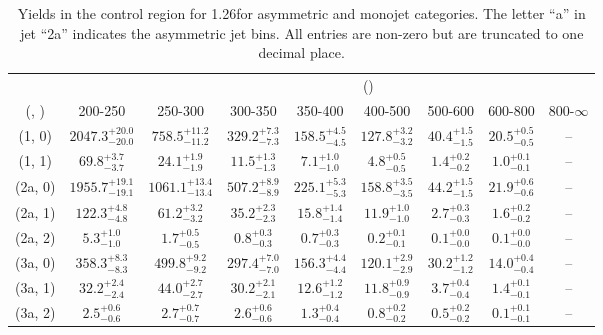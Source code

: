 \begin{table}[h!]
\tiny
\centering
\caption{Yields in the \mj control region for 1.26\ifb for asymmetric and monojet categories. The letter ``a'' in jet \eg ``2a''  indicates the asymmetric jet bins. All entries are non-zero but are truncated to one decimal place.\label{tab:yieldssep_mu_wjetstolnuht_asym}}
\begin{tabular}
{ccccccccc}
	\hline\hline
&	& \multicolumn{8}{c}{\scalht (\gev)} \\ 
	 (\njet,  \nb) & 200-250 & 250-300 & 300-350 & 350-400 & 400-500 & 500-600 & 600-800 & 800-$\infty$ \\ [0.8ex] 
\hline
	(1, 0) & $2047.3^{+ 20.0 }_{- 20.0 }$ & $758.5^{+ 11.2 }_{- 11.2 }$ & $329.2^{+ 7.3 }_{- 7.3 }$ & $158.5^{+ 4.5 }_{- 4.5 }$ & $127.8^{+ 3.2 }_{- 3.2 }$ & $40.4^{+ 1.5 }_{- 1.5 }$ & $20.5^{+ 0.5 }_{- 0.5 }$ & -- \\[0.5ex] 
	(1, 1) & $69.8^{+ 3.7 }_{- 3.7 }$ & $24.1^{+ 1.9 }_{- 1.9 }$ & $11.5^{+ 1.3 }_{- 1.3 }$ & $7.1^{+ 1.0 }_{- 1.0 }$ & $4.8^{+ 0.5 }_{- 0.5 }$ & $1.4^{+ 0.2 }_{- 0.2 }$ & $1.0^{+ 0.1 }_{- 0.1 }$ & -- \\[0.5ex] 
	(2a, 0) & $1955.7^{+ 19.1 }_{- 19.1 }$ & $1061.1^{+ 13.4 }_{- 13.4 }$ & $507.2^{+ 8.9 }_{- 8.9 }$ & $225.1^{+ 5.3 }_{- 5.3 }$ & $158.8^{+ 3.5 }_{- 3.5 }$ & $44.2^{+ 1.5 }_{- 1.5 }$ & $21.9^{+ 0.6 }_{- 0.6 }$ & -- \\[0.5ex] 
	(2a, 1) & $122.3^{+ 4.8 }_{- 4.8 }$ & $61.2^{+ 3.2 }_{- 3.2 }$ & $35.2^{+ 2.3 }_{- 2.3 }$ & $15.8^{+ 1.4 }_{- 1.4 }$ & $11.9^{+ 1.0 }_{- 1.0 }$ & $2.7^{+ 0.3 }_{- 0.3 }$ & $1.6^{+ 0.2 }_{- 0.2 }$ & -- \\[0.5ex] 
	(2a, 2) & $5.3^{+ 1.0 }_{- 1.0 }$ & $1.7^{+ 0.5 }_{- 0.5 }$ & $0.8^{+ 0.3 }_{- 0.3 }$ & $0.7^{+ 0.3 }_{- 0.3 }$ & $0.2^{+ 0.1 }_{- 0.1 }$ & $0.1^{+ 0.0 }_{- 0.0 }$ & $0.1^{+ 0.0 }_{- 0.0 }$ & -- \\[0.5ex] 
	(3a, 0) & $358.3^{+ 8.3 }_{- 8.3 }$ & $499.8^{+ 9.2 }_{- 9.2 }$ & $297.4^{+ 7.0 }_{- 7.0 }$ & $156.3^{+ 4.4 }_{- 4.4 }$ & $120.1^{+ 2.9 }_{- 2.9 }$ & $30.2^{+ 1.2 }_{- 1.2 }$ & $14.0^{+ 0.4 }_{- 0.4 }$ & -- \\[0.5ex] 
	(3a, 1) & $32.2^{+ 2.4 }_{- 2.4 }$ & $44.0^{+ 2.7 }_{- 2.7 }$ & $30.2^{+ 2.1 }_{- 2.1 }$ & $12.6^{+ 1.2 }_{- 1.2 }$ & $11.8^{+ 0.9 }_{- 0.9 }$ & $3.7^{+ 0.4 }_{- 0.4 }$ & $1.4^{+ 0.1 }_{- 0.1 }$ & -- \\[0.5ex] 
	(3a, 2) & $2.5^{+ 0.6 }_{- 0.6 }$ & $2.7^{+ 0.7 }_{- 0.7 }$ & $2.6^{+ 0.6 }_{- 0.6 }$ & $1.3^{+ 0.4 }_{- 0.4 }$ & $0.8^{+ 0.2 }_{- 0.2 }$ & $0.5^{+ 0.2 }_{- 0.2 }$ & $0.1^{+ 0.1 }_{- 0.1 }$ & -- \\[0.5ex] 

\end{tabular}
\end{table}
